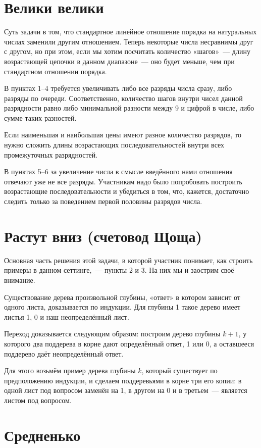 \documentclass[a4paper,11pt]{article}
\begin{document}
\section{Велики велики}

Суть задачи в том, что стандартное линейное отношение порядка на натуральных числах заменили другим отношением. Теперь некоторые числа несравнимы друг с другом, но при этом, если мы хотим посчитать количество «шагов»~— длину возрастающей цепочки в данном диапазоне~— оно будет меньше, чем при стандартном отношении порядка.

В пунктах 1–4 требуется увеличивать либо все разряды числа сразу, либо разряды по очереди. Соответственно, количество шагов внутри чисел данной разрядности равно либо минимальной разности между 9 и цифрой в числе, либо сумме таких разностей.

Если наименьшая и наибольшая цены имеют разное количество разрядов, то нужно сложить длины возрастающих последовательностей внутри всех промежуточных разрядностей.

В пунктах 5–6 за увеличение числа в смысле введённого нами отношения отвечают уже не все разряды. Участникам надо было попробовать построить возрастающие последовательности и убедиться в том, что, кажется, достаточно следить только за поведением первой половины разрядов числа.

\section{Растут вниз (счетовод Щоща)}

Основная часть решения этой задачи, в которой участник понимает, как строить примеры в данном сеттинге,~— пункты 2 и 3. На них мы и заострим своё внимание.

Существование дерева произвольной глубины, «ответ» в котором зависит от одного листа, доказывается по индукции. Для глубины 1 такое дерево имеет листья 1, 0 и наш неопределённый лист.

Переход доказывается следующим образом: построим дерево глубины \( k+1 \), у которого два поддерева в корне дают определённый ответ, 1 или 0, а оставшееся поддерево даёт неопределённый ответ.

Для этого возьмём пример дерева глубины \( k \), который существует по предположению индукции, и сделаем поддеревьями в корне три его копии: в одной лист под вопросом заменён на 1, в другом на 0 и в третьем~— является листом под вопросом.

\section{Средненько}
\end{document}
